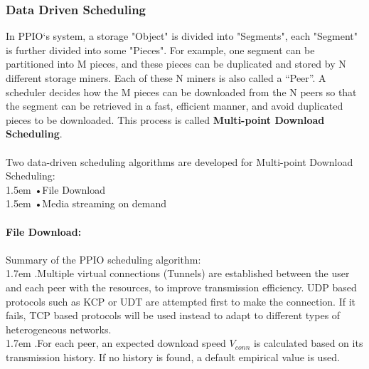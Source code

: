 \documentclass[10pt,a4paper]{article}
\begin{document}
       \subsubsection{Data Driven Scheduling}  %
In PPIO‘s system, a storage "Object" is divided into "Segments", each "Segment" is further divided into some "Pieces". For example, one segment can be partitioned into M pieces, and these pieces can be duplicated and stored by N different storage miners. Each of these N miners is also called a “Peer”. A scheduler decides how the M pieces can be downloaded from the N peers so that the segment can be retrieved in a fast, efficient manner, and avoid duplicated pieces to be downloaded. This process is called {\bf Multi-point Download Scheduling}.
\vspace{-0.5em}
\\ \\Two data-driven scheduling algorithms are developed for Multi-point Download Scheduling:
\vspace{-0.8em}
\\ 

\hangindent 1.5em
\noindent   
•\quad File Download
\vspace{-0.8em}
\\ 

\hangindent 1.5em
\noindent   
•\quad Media streaming on demand\cite{article4} 
\vspace{-1.5em}
\\ 

\noindent
\\{\bf File Download:}
\vspace{-0.6em}
\\\\Summary of the PPIO scheduling algorithm:
\vspace{-0.6em}
\\ 

\hangindent 1.7em
.\quad Multiple virtual connections (Tunnels) are established between the user and each peer with the resources, to improve transmission efficiency. UDP based protocols such as KCP or UDT\cite{article13} are attempted first to make the connection. If it fails, TCP based protocols will be used instead to adapt to different types of heterogeneous networks.
\vspace{-0.8em}
\\ 

\hangindent 1.7em
.\quad For each peer, an expected download speed $V_{conn}$ is calculated based on its transmission history. If no history is found, a default empirical value is used.
\vspace{-0.8em}
\\ 
\end{document}
